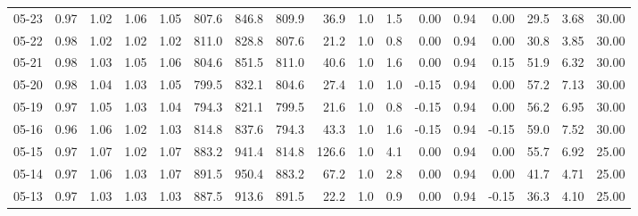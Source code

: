 \begin{threeparttable}
{\begin{tabular}{lrrrrrrrrrrrrrrrr}
  05-23 &         0.97 &           1.02 &          1.06 &          1.05 & 807.6 & 846.8 & 809.9 &       36.9 &                      1.0 &                 1.5 &       0.00 &      0.94 &           0.00 &             29.5 &            3.68 &                  30.00 \\
  05-22 &         0.98 &           1.02 &          1.02 &          1.02 & 811.0 & 828.8 & 807.6 &       21.2 &                      1.0 &                 0.8 &       0.00 &      0.94 &           0.00 &             30.8 &            3.85 &                  30.00 \\
  05-21 &         0.98 &           1.03 &          1.05 &          1.06 & 804.6 & 851.5 & 811.0 &       40.6 &                      1.0 &                 1.6 &       0.00 &      0.94 &           0.15 &             51.9 &            6.32 &                  30.00 \\
  05-20 &         0.98 &           1.04 &          1.03 &          1.05 & 799.5 & 832.1 & 804.6 &       27.4 &                      1.0 &                 1.0 &      -0.15 &      0.94 &           0.00 &             57.2 &            7.13 &                  30.00 \\
  05-19 &         0.97 &           1.05 &          1.03 &          1.04 & 794.3 & 821.1 & 799.5 &       21.6 &                      1.0 &                 0.8 &      -0.15 &      0.94 &           0.00 &             56.2 &            6.95 &                  30.00 \\
  05-16 &         0.96 &           1.06 &          1.02 &          1.03 & 814.8 & 837.6 & 794.3 &       43.3 &                      1.0 &                 1.6 &      -0.15 &      0.94 &          -0.15 &             59.0 &            7.52 &                  30.00 \\
  05-15 &         0.97 &           1.07 &          1.02 &          1.07 & 883.2 & 941.4 & 814.8 &      126.6 &                      1.0 &                 4.1 &       0.00 &      0.94 &           0.00 &             55.7 &            6.92 &                  25.00 \\
  05-14 &         0.97 &           1.06 &          1.03 &          1.07 & 891.5 & 950.4 & 883.2 &       67.2 &                      1.0 &                 2.8 &       0.00 &      0.94 &           0.00 &             41.7 &            4.71 &                  25.00 \\
  05-13 &         0.97 &           1.03 &          1.03 &          1.03 & 887.5 & 913.6 & 891.5 &       22.2 &                      1.0 &                 0.9 &       0.00 &      0.94 &          -0.15 &             36.3 &            4.10 &                  25.00 \\

\end{tabular}}
\end{threeparttable}
